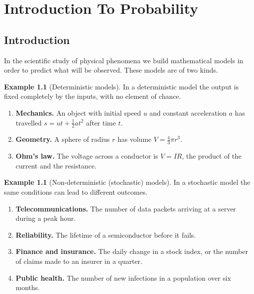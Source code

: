 \documentclass[12pt,a4paper]{report}
\theoremstyle{definition}
\newtheorem{example}[thm]{Example}
\theoremstyle{plain}
\theoremstyle{definition}
\begin{document}
     


\chapter{Introduction To Probability}

\section{Introduction}

In the scientific study of physical phenomena we build mathematical models in
order to predict what will be observed. These models are of two kinds.

\begin{example}[Deterministic models]
\label{ex:deterministic}
In a deterministic model the output is fixed completely by the inputs, with no
element of chance.
\begin{enumerate}
\item[(i)] \textbf{Mechanics.} An object with initial speed $u$ and constant
acceleration $a$ has travelled $s = ut + \frac12at^2$ after time $t$.
\item[(ii)] \textbf{Geometry.} A sphere of radius $r$ has volume $V = \frac43\pi r^3$.
\item[(iii)] \textbf{Ohm's law.} The voltage across a conductor is $V = IR$, the
product of the current and the resistance.
\end{enumerate}
\end{example}

\begin{example}[Non-deterministic (stochastic) models]
\label{ex:stochastic}
In a stochastic model the same conditions can lead to different outcomes.
\begin{enumerate}
\item[(i)] \textbf{Telecommunications.} The number of data packets arriving at a
server during a peak hour.
\item[(ii)] \textbf{Reliability.} The lifetime of a semiconductor before it fails.
\item[(iii)] \textbf{Finance and insurance.} The daily change in a stock index, or the
number of claims made to an insurer in a quarter.
\item[(iv)] \textbf{Public health.} The number of new infections in a population over
six months.
\end{enumerate}
\end{example}
\end{document}
